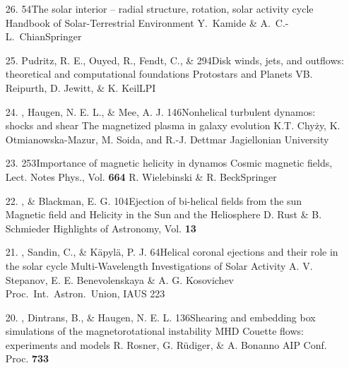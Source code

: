 \begin{itemize}
\item[26.]
\Brandenburg{}
{54}{The solar interior -- radial structure, rotation, solar activity cycle}
{Handbook of Solar-Terrestrial Environment}
{Y.\ Kamide \& A.\ C.-L.\ Chian}{Springer}

\item[25.]
Pudritz, R. E., Ouyed, R., Fendt, C., \& \Brandenburg{}
{294}{Disk winds, jets, and outflows: theoretical and computational foundations}
{Protostars and Planets V}{B. Reipurth, D. Jewitt, \& K. Keil}{LPI}

\item[24.]
\Brandenburg, Haugen, N. E. L., \& Mee, A. J.
{146}{Nonhelical turbulent dynamos: shocks and shear}
{The magnetized plasma in galaxy evolution}
{K.T. Chy\.zy, K. Otmianowska-Mazur, M. Soida, and R.-J. Dettmar}
{Jagiellonian University}

\item[23.]
\Brandenburg{}
{253}{Importance of magnetic helicity in dynamos}
{Cosmic magnetic fields, Lect. Notes Phys., Vol. {\bf664}}
{R. Wielebinski \& R. Beck}{Springer}

\item[22.]
\Brandenburg, \& Blackman, E. G.
{104}{Ejection of bi-helical fields from the sun}
{Magnetic field and Helicity in the Sun and the Heliosphere}
{D. Rust \& B. Schmieder}
{Highlights of Astronomy, Vol. {\bf 13}}

\item[21.]
\Brandenburg, Sandin, C., \& K\"apyl\"a, P. J.
{64}{Helical coronal ejections and their role in the solar cycle}
{Multi-Wavelength Investigations of Solar Activity}
{A. V. Stepanov, E. E. Benevolenskaya \& A. G. Kosovichev}
{Proc.\ Int.\ Astron.\ Union, IAUS 223}

\item[20.]
\Brandenburg, Dintrans, B., \& Haugen, N. E. L.
{136}{Shearing and embedding box simulations of the magnetorotational
instability}
{MHD Couette flows: experiments and models}
{R. Rosner, G. R\"udiger, \& A. Bonanno}
{AIP Conf. Proc. {\bf 733}}


\end{itemize}
